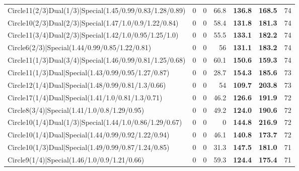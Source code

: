 \begin{tabular}{lrrrllr}
 Circle11(2/3)Dual(1/3)|Special(1.45/0.99/0.83/1.28/0.89)       &          0   &            0   &          66.8 & \textbf{136.8} & \textbf{168.5} &           74 \\
 Circle10(2/3)Dual(2/3)|Special(1.47/1.0/0.9/1.22/0.84)         &          0   &            0   &          58.4 & \textbf{131.8} & \textbf{181.3} &           74 \\
 Circle11(3/4)Dual(2/3)|Special(1.42/1.0/0.95/1.25/1.0)         &          0   &            0   &          55.5 & \textbf{133.1} & \textbf{182.2} &           74 \\
 Circle6(2/3)|Special(1.44/0.99/0.85/1.22/0.81)                 &          0   &            0   &          56   & \textbf{131.1} & \textbf{183.2} &           74 \\
 Circle11(1/3)Dual(3/4)|Special(1.46/0.99/0.81/1.25/0.68)       &          0   &            0   &          60.1 & \textbf{150.6} & \textbf{159.3} &           74 \\
 Circle11(1/3)Dual|Special(1.43/0.99/0.95/1.27/0.87)            &          0   &            0   &          28.7 & \textbf{154.3} & \textbf{185.6} &           73 \\
 Circle12(1/4)Dual|Special(1.48/0.99/0.81/1.3/0.66)             &          0   &            0   &          54   & \textbf{109.7} & \textbf{203.8} &           73 \\
 Circle17(1/4)Dual|Special(1.41/1.0/0.81/1.3/0.71)              &          0   &            0   &          46.2 & \textbf{126.6} & \textbf{191.9} &           72 \\
 Circle8(3/4)|Special(1.41/1.0/0.8/1.29/0.95)                   &          0   &            0   &          49.2 & \textbf{124.0} & \textbf{190.6} &           72 \\
 Circle10(1/4)Dual(1/3)|Special(1.44/1.0/0.86/1.29/0.67)        &          0   &            0   &           0   & \textbf{144.8} & \textbf{216.9} &           72 \\
 Circle10(1/4)Dual|Special(1.44/0.99/0.92/1.22/0.94)            &          0   &            0   &          46.1 & \textbf{140.8} & \textbf{173.7} &           72 \\
 Circle10(1/3)Dual|Special(1.49/0.99/0.87/1.24/0.85)            &          0   &            0   &          31.3 & \textbf{147.5} & \textbf{181.0} &           71 \\
 Circle9(1/4)|Special(1.46/1.0/0.9/1.21/0.66)                   &          0   &            0   &          59.3 & \textbf{124.4} & \textbf{175.4} &           71 \\

\end{tabular}
